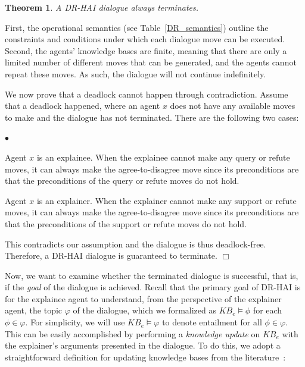 \documentclass[letterpaper]{article} %
\newtheorem{theorem}{{\bf Theorem}}
\newenvironment{skproof}{\noindent {\sc Proof (sketch).}}{\hfill$\Box$}
\newcommand{\squishlist}{
\begin{list}{$\bullet$}{ 
    \setlength{\itemsep}{1pt}
    \setlength{\parsep}{0pt}
    \setlength{\topsep}{1.5pt}
    \setlength{\partopsep}{0pt}
    \setlength{\leftmargin}{1em}
    \setlength{\labelwidth}{1em}
    \setlength{\labelsep}{0.5em} } }
\newcommand{\squishend}{\end{list}  }
\begin{document}
\begin{theorem}
    A DR-HAI dialogue always terminates.
    \label{term_theo}
\end{theorem}



 \begin{skproof}
 First, the operational semantics (see Table~\ref{DR_semantics}) outline the constraints and conditions under which each dialogue move can be executed. Second, the agents' knowledge bases are finite, meaning that there are only a limited number of different moves that can be generated, and the agents cannot repeat these moves. As such, the dialogue will not continue indefinitely. 

 We now prove that a deadlock cannot happen through contradiction. Assume that a deadlock happened, where an agent $x$ does not have any available moves to make and the dialogue has not terminated. There are the following two cases:
 \squishlist
 \item Agent $x$ is an explainee. When the explainee cannot make any $\mbox{query}$ or $\mbox{refute}$ moves, it can always make the \mbox{agree}-\mbox{to}-\mbox{disagree} move since its preconditions are that the preconditions of the $\mbox{query}$ or $\mbox{refute}$ moves do not hold. 
 \item Agent $x$ is an explainer. When the explainer cannot make any $\mbox{support}$ or $\mbox{refute}$ moves, it can always make the \mbox{agree}-\mbox{to}-\mbox{disagree} move since its preconditions are that the preconditions of the $\mbox{support}$ or $\mbox{refute}$ moves do not hold. 
 \squishend
 This contradicts our assumption and the dialogue is thus deadlock-free. Therefore, a DR-HAI dialogue is guaranteed to terminate.
 \end{skproof}

\smallskip 
Now, we want to examine whether the terminated dialogue is successful, that is, if the \emph{goal} of the dialogue is achieved. Recall that the primary goal of DR-HAI is for the explainee agent to understand, from the perspective of the explainer agent, the topic $\varphi$ of the dialogue, which we formalized as $KB_e \models \phi$ for each $\phi \in \varphi$. For simplicity, we will use $KB_e \models \varphi$ to denote entailment for all $\phi \in \varphi$. This can be easily accomplished by performing a \emph{knowledge update} on $KB_e$ with the explainer's arguments presented in the dialogue. To do this, we adopt a straightforward definition for updating knowledge bases from the literature~\cite{vasileioulogic}:
\end{document}

